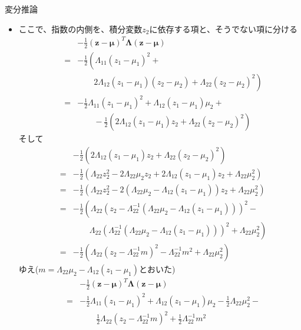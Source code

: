 \documentclass[dvipdfmx,notheorems,t]{beamer}
\begin{document}
\begin{frame}{変分推論}
\begin{itemize}
\begin{itemize}
		\item ここで、指数の内側を、積分変数$z_2$に依存する項と、そうでない項に分ける
		\begin{eqnarray}
			&& -\frac{1}{2} (\bm{z} - \bm{\mu})^T \bm{\Lambda} (\bm{z} - \bm{\mu}) \nonumber \\
			&=& -\frac{1}{2} \left( \Lambda_{11} (z_1 - \mu_1)^2 + \right. \nonumber \\
			&& \qquad \left. 2 \Lambda_{12} (z_1 - \mu_1)(z_2 - \mu_2) + \Lambda_{22} (z_2 - \mu_2)^2 \right) \\
			&=& -\frac{1}{2} \Lambda_{11} (z_1 - \mu_1)^2 + \Lambda_{12} (z_1 - \mu_1) \mu_2 + \nonumber \\
			&& \qquad -\frac{1}{2} \left( 2 \Lambda_{12} (z_1 - \mu_1) z_2 + \Lambda_{22} (z_2 - \mu_2)^2 \right)
		\end{eqnarray}
		そして
		\begin{eqnarray}
			&& -\frac{1}{2} \left( 2 \Lambda_{12} (z_1 - \mu_1) z_2 + \Lambda_{22} (z_2 - \mu_2)^2 \right) \nonumber \\
			&=& -\frac{1}{2} \left( \Lambda_{22} z_2^2 - 2 \Lambda_{22} \mu_2 z_2 + 2 \Lambda_{12} (z_1 - \mu_1) z_2 + \Lambda_{22} \mu_2^2 \right) \\
			&=& -\frac{1}{2} \left( \Lambda_{22} z_2^2 - 2 \left( \Lambda_{22} \mu_2 - \Lambda_{12} (z_1 - \mu_1) \right) z_2 + \Lambda_{22} \mu_2^2 \right) \\
			&=& -\frac{1}{2} \left( \Lambda_{22} \left( z_2 - \Lambda_{22}^{-1} \left( \Lambda_{22} \mu_2 - \Lambda_{12} (z_1 - \mu_1) \right) \right)^2 - \right. \nonumber \\
			&& \qquad \left. \Lambda_{22} \left( \Lambda_{22}^{-1} \left( \Lambda_{22} \mu_2 - \Lambda_{12} (z_1 - \mu_1) \right) \right)^2 + \Lambda_{22} \mu_2^2 \right) \\
			&=& -\frac{1}{2} \left( \Lambda_{22} \left( z_2 - \Lambda_{22}^{-1} m \right)^2 - \Lambda_{22}^{-1} m^2 + \Lambda_{22} \mu_2^2 \right)
		\end{eqnarray}
		ゆえ($m = \Lambda_{22} \mu_2 - \Lambda_{12} (z_1 - \mu_1)$とおいた)
		\begin{eqnarray}
			&& -\frac{1}{2} (\bm{z} - \bm{\mu})^T \bm{\Lambda} (\bm{z} - \bm{\mu}) \nonumber \\
			&=& -\frac{1}{2} \Lambda_{11} (z_1 - \mu_1)^2 + \Lambda_{12} (z_1 - \mu_1) \mu_2 - \frac{1}{2} \Lambda_{22} \mu_2^2 - \nonumber \\
			&& \qquad \frac{1}{2} \Lambda_{22} \left( z_2 - \Lambda_{22}^{-1} m \right)^2 + \frac{1}{2} \Lambda_{22}^{-1} m^2
		\end{eqnarray}
		

\end{itemize}
\end{itemize}
\end{frame}
\end{document}
